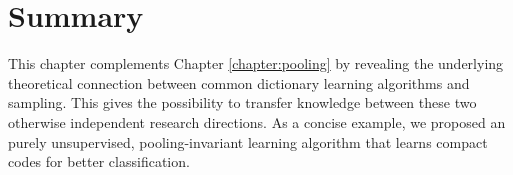 \section{Summary}
This chapter complements Chapter \ref{chapter:pooling} by revealing the underlying theoretical connection between common dictionary learning algorithms and \nystrom sampling. This gives the possibility to transfer knowledge between these two otherwise independent research directions. As a concise example, we proposed an purely unsupervised, pooling-invariant learning algorithm that learns compact codes for better classification.

